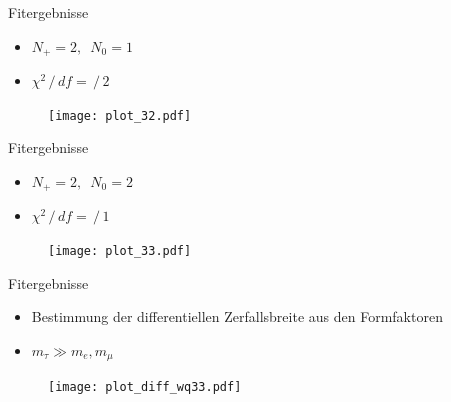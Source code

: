 \documentclass[fleqn, aspectratio=1610, professionalfonts, 9pt]{beamer}
\begin{document}
\begin{frame}{Fitergebnisse}
  \begin{minipage}{4.5cm}
    \begin{itemize}
      \setlength\itemsep{2em}
      \item $N_+ = \num{2}, \enspace N_0 = \num{1}$
      \item $\chi^2 \,/\, df=  \,/\, \num{2}$
    \end{itemize}
  \end{minipage}
  \begin{minipage}{10cm}
    \begin{figure}
      \centering
      \texttt{[image: plot\_32.pdf]}
    \end{figure}
  \end{minipage}%
\end{frame}

\begin{frame}{Fitergebnisse}
  \begin{minipage}{4.5cm}
    \begin{itemize}
      \setlength\itemsep{2em}
      \item $N_+ = \num{2}, \enspace N_0 = \num{2}$
      \item $\chi^2 \,/\, df=  \,/\, \num{1}$
    \end{itemize}
  \end{minipage}
  \begin{minipage}{10cm}
    \begin{figure}
      \centering
      \texttt{[image: plot\_33.pdf]}
    \end{figure}
  \end{minipage}%
\end{frame}

\begin{frame}{Fitergebnisse}
  \begin{minipage}{5cm}
    \begin{itemize}
      \setlength\itemsep{2em}
      \item<1-> Bestimmung der differentiellen Zerfallsbreite aus den Formfaktoren
      \item<2-> $m_{\tau} \gg m_e, m_{\mu}$
    \end{itemize}
  \end{minipage}
  \begin{minipage}{9cm}
    \begin{figure}
      \centering
      \texttt{[image: plot\_diff\_wq33.pdf]}
    \end{figure}
  \end{minipage}%
\end{frame}
\end{document}
